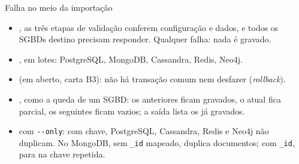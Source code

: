 \begin{frame}{Falha no meio da importação}
  \small
  \begin{itemize}
    \setlength{\itemsep}{5pt}
    \item {}, as três etapas de validação conferem configuração e
          dados, e todos os SGBDs destino precisam responder. Qualquer falha: nada é gravado.
    \item {}, em lotes: PostgreSQL, MongoDB, Cassandra, Redis, Neo4j.
    \item {} (em aberto, carta B3): não há transação
          comum nem desfazer (\textit{rollback}).
    \item {}, como a queda de um SGBD: os anteriores ficam
          gravados, o atual fica parcial, os seguintes ficam vazios; a saída lista os já
          gravados.
    \item {} com \texttt{-{}-only}: com chave, PostgreSQL, Cassandra, Redis
          e Neo4j não duplicam. No MongoDB, sem \texttt{\_id} mapeado, duplica documentos;
          com \texttt{\_id}, para na chave repetida.
  \end{itemize}
\end{frame}

